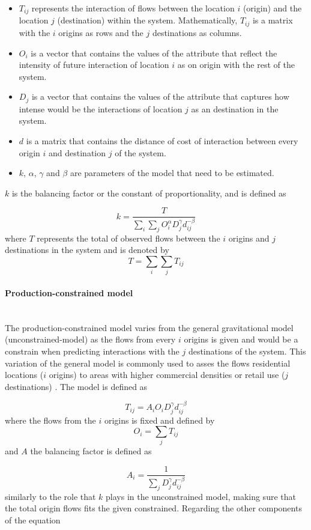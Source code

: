 \documentclass{article}
\begin{document}
\begin{itemize}
  \item $T_{ij}$ represents the interaction of flows between the location $i$ (origin) and the location $j$ (destination) within the system. Mathematically,  $T_{ij}$ is a matrix with the $i$ origins as rows and the $j$ destinations as columns.
  \item $O_{i}$ is a vector that contains the values of the attribute that reflect the intensity of future interaction of location $i$ as on origin with the rest of the system.
  \item $D_{j}$ is a vector that contains the values of the attribute that captures how intense would be the interactions of location $j$ as an destination in the system.
    \item $d$ is a matrix that contains the distance of cost of interaction between every origin $i$ and destination $j$ of the system.
    \item $k$, $\alpha$, $\gamma$ and $\beta$ are parameters of the model that need to be estimated.
\end{itemize}

$k$ is the balancing factor or the constant of proportionality, and is defined as

\[k = \frac{T}{\sum_i \sum_j O_i^\alpha  D_j^\gamma  d_{ij}^{-\beta}}\] where $T$ represents the total of observed flows between the $i$ origins and $j$ destinations in the system and is denoted by \[T= \sum_i \sum_j T_{ij}\]
\paragraph{Production-constrained model}\mbox{}\\

The production-constrained model varies from the general gravitational model (unconstrained-model) as the flows from every $i$ origins is given and would be a constrain when predicting interactions with the $j$ destinations of the system. This variation of the general model is commonly used to asses the flows residential locations ($i$ origins) to areas with higher commercial densities or retail use ($j$ destinations) \citep{wilkinsonSpatialInteractionModelling2023}. The model is defined as

\[T_{ij} = A_i O_i D_j^\gamma d_{ij}^{-\beta}\] where the flows from the $i$ origins is fixed and defined by \[O_i = \sum_j T_{ij}\] and $A$ the balancing factor is defined as

\[A_i = \frac{1}{\sum_j D_j^\gamma d_{ij}^{-\beta}}\] similarly to the role that $k$ plays in the unconstrained model, making sure that the total origin flows fits the given constrained.  Regarding the other components of the equation
\end{document}
